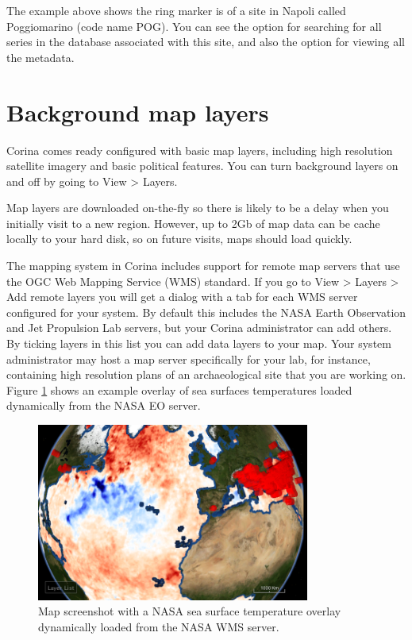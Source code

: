 The example above shows the ring marker is of a site in Napoli called Poggiomarino (code name POG). You can see the option for searching for all series in the database associated with this site, and also the option for viewing all the metadata. 

\section{Background map layers}

Corina comes ready configured with basic map layers, including high resolution satellite imagery and basic political features. You can turn background layers on and off by going to View > Layers.

Map layers are downloaded on-the-fly so there is likely to be a delay when you initially visit to a new region. However, up to 2Gb of map data can be cache locally to your hard disk, so on future visits, maps should load quickly.

The mapping system in Corina includes support for remote map servers that use the OGC Web Mapping Service (WMS) standard. If you go to View > Layers > Add remote layers you will get a dialog with a tab for each WMS server configured for your system. By default this includes the NASA Earth Observation and Jet Propulsion Lab servers, but your Corina administrator can add others. By ticking layers in this list you can add data layers to your map. Your system administrator may host a map server specifically for your lab, for instance, containing high resolution plans of an archaeological site that you are working on. Figure \ref{fig:wms} shows an example overlay of sea surfaces temperatures loaded dynamically from the NASA EO server.

\begin{figure}[hbtp]
  \caption{Map screenshot with a NASA sea surface temperature overlay dynamically loaded from the NASA WMS server.}
  \label{fig:wms}
  \centering
    \includegraphics[width=0.8\textwidth]{Images/sst.png}
\end{figure}

